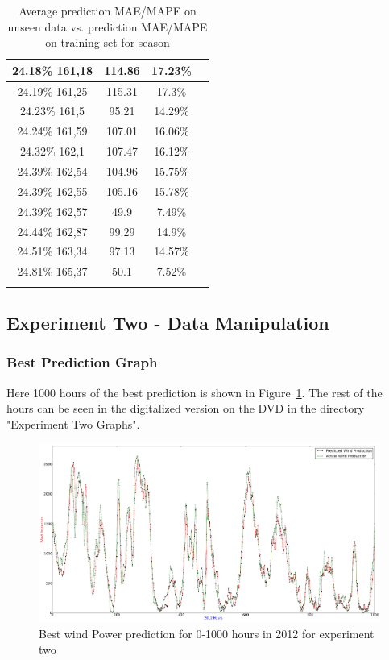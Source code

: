 \begin{center}
\begin{longtable}{|c|c|c|c|}
24.18\% 161,18 & 114.86 & 17.23\%  \\ \hline
24.19\% 161,25 & 115.31 & 17.3\%  \\ \hline
24.23\% 161,5 & 95.21 & 14.29\%  \\ \hline
24.24\% 161,59 & 107.01 & 16.06\%  \\ \hline
24.32\% 162,1 & 107.47 & 16.12\%  \\ \hline
24.39\% 162,54 & 104.96 & 15.75\%  \\ \hline
24.39\% 162,55 & 105.16 & 15.78\%  \\ \hline
24.39\% 162,57 & 49.9 & 7.49\%  \\ \hline
24.44\% 162,87 & 99.29 & 14.9\%  \\ \hline
24.51\% 163,34 & 97.13 & 14.57\%  \\ \hline
24.81\% 165,37 & 50.1 & 7.52\%  \\ \hline
\caption{Average prediction MAE/MAPE on unseen data vs. prediction MAE/MAPE on training set for season}
\label{table:predictionMAEUnseenVsTrainingSetSeasonAppendix}
\end{longtable}
\end{center}
\normalsize

\subsection{Experiment Two - Data Manipulation}

\subsubsection{Best Prediction Graph}
Here 1000 hours of the best prediction is shown in Figure~\ref{fig:experimentTwoInput}. The rest of the hours can be seen in the digitalized version on the DVD in the directory "Experiment Two Graphs".

\begin{figure}
\centering
\includegraphics[width=0.99\linewidth]{billeder/experimentTwoInput.png}
\caption{Best wind Power prediction for 0-1000 hours in 2012 for experiment two}
\label{fig:experimentTwoInput}
\end{figure} 
